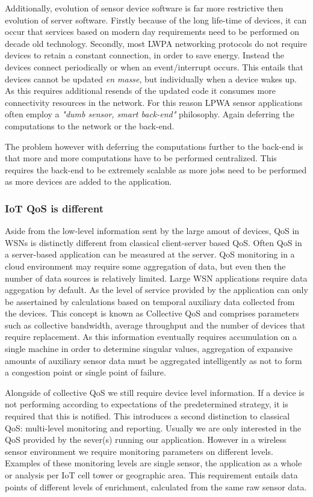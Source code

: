 Additionally, evolution of sensor device software is far more restrictive then evolution of server software. Firstly because of the long life-time of devices, it can occur that services based on modern day requirements need to be performed on decade old technology. Secondly, most LWPA networking protocols do not require devices to retain a constant connection, in order to save energy\cite{tmobile, vodafone, iets met nbiot specs}. Instead the devices connect periodically or when an event/interrupt occurs. This entails that devices cannot be updated \emph{en masse}, but individually when a device wakes up. As this requires additional resends of the updated code it consumes more connectivity resources in the network. For this reason LPWA sensor applications often employ a \emph{"dumb sensor, smart back-end"} philosophy. Again deferring the computations to the network or the back-end.

The problem however with deferring the computations further to the back-end is that more and more computations have to be performed centralized. This requires the back-end to be extremely scalable as more jobs need to be performed as more devices are added to the application.

\subsubsection{IoT QoS is different}
Aside from the low-level information sent by the large amout of devices, QoS in WSNs is distinctly different from classical client-server based QoS. Often QoS in a server-based application can be measured at the server. QoS monitoring in a cloud environment may require some aggregation of data, but even then the number of data sources is relatively limited. Large WSN applications require data aggegation by default. As the level of service provided by the application can only be assertained by calculations based on temporal auxiliary data collected from the devices. This concept is known as Collective QoS \cite{collective_qos} and comprises parameters such as collective bandwidth, average throughput and the number of devices that require replacement. As this information eventually requires accumulation on a single machine in order to determine singular values, aggregation of expansive amounts of auxiliary sensor data must be aggregated intelligently as not to form a congestion point or single point of failure.

Alongside of collective QoS we still require device level information. If a device is not performing according to expectations of the predetermined strategy, it is required that this is notified. This introduces a second distinction to classical QoS: multi-level monitoring and reporting. Usually we are only interested in the QoS provided by the sever(s) running our application. However in a wireless sensor environment we require monitoring parameters on different levels. Examples of these monitoring levels are single sensor, the application as a whole or analysis per IoT cell tower or geographic area. This requirement entails data points of different levels of enrichment, calculated from the same raw sensor data.

